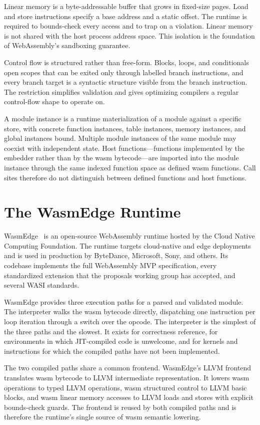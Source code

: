 Linear memory is a byte-addressable buffer that grows in fixed-size pages. Load and store instructions specify a base address and a static offset. The runtime is required to bounds-check every access and to trap on a violation. Linear memory is not shared with the host process address space. This isolation is the foundation of WebAssembly's sandboxing guarantee.

Control flow is structured rather than free-form. Blocks, loops, and conditionals open scopes that can be exited only through labelled branch instructions, and every branch target is a syntactic structure visible from the branch instruction. The restriction simplifies validation and gives optimizing compilers a regular control-flow shape to operate on.

A module instance is a runtime materialization of a module against a specific store, with concrete function instances, table instances, memory instances, and global instances bound. Multiple module instances of the same module may coexist with independent state. Host functions---functions implemented by the embedder rather than by the wasm bytecode---are imported into the module instance through the same indexed function space as defined wasm functions. Call sites therefore do not distinguish between defined functions and host functions.

\section{The WasmEdge Runtime}
\label{sec:bg:wasmedge}

WasmEdge~\cite{wasmedge-docs} is an open-source WebAssembly runtime hosted by the Cloud Native Computing Foundation. The runtime targets cloud-native and edge deployments and is used in production by ByteDance, Microsoft, Sony, and others. Its codebase implements the full WebAssembly MVP specification, every standardized extension that the proposals working group has accepted, and several WASI standards.

WasmEdge provides three execution paths for a parsed and validated module. The interpreter walks the wasm bytecode directly, dispatching one instruction per loop iteration through a switch over the opcode. The interpreter is the simplest of the three paths and the slowest. It exists for correctness reference, for environments in which JIT-compiled code is unwelcome, and for kernels and instructions for which the compiled paths have not been implemented.

The two compiled paths share a common frontend. WasmEdge's LLVM frontend translates wasm bytecode to LLVM intermediate representation. It lowers wasm operations to typed LLVM operations, wasm structured control to LLVM basic blocks, and wasm linear memory accesses to LLVM loads and stores with explicit bounds-check guards. The frontend is reused by both compiled paths and is therefore the runtime's single source of wasm semantic lowering.

